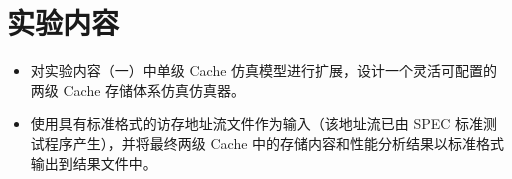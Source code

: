 
\section{实验内容}\label{sec:one}
\begin{itemize}
    \item 对实验内容（一）中单级 Cache 仿真模型进行扩展，设计一个灵活可配置的两级 Cache 存储体系仿真仿真器。 
    \item 使用具有标准格式的访存地址流文件作为输入（该地址流已由 SPEC 标准测试程序产生），并将最终两级 Cache 中的存储内容和性能分析结果以标准格式输出到结果文件中。 
\end{itemize}

